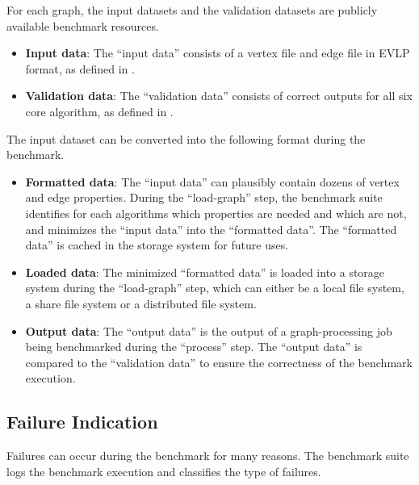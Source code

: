 For each graph, the input datasets and the validation datasets are publicly available benchmark resources.

\begin{itemize} 
    \item \textbf{Input data}: The ``input data'' consists of a vertex file and edge file in EVLP format, as defined in .
    \item \textbf{Validation data}: The ``validation data'' consists of correct outputs for all six core algorithm, as defined in .
\end{itemize}

The input dataset can be converted into the following format during the benchmark.

\begin{itemize}
    \item \textbf{Formatted data}: The ``input data'' can plausibly contain dozens of vertex and edge properties. During the ``load-graph'' step, the benchmark suite identifies for each algorithms which properties are needed and which are not, and minimizes the ``input data'' into the ``formatted data''. The ``formatted data'' is cached in the storage system for future uses. 
    \item \textbf{Loaded data}: The minimized ``formatted data'' is loaded into a storage system during the ``load-graph'' step, which can either be a local file system, a share file system or a distributed file system.
    \item \textbf{Output data}: The ``output data'' is the output of a graph-processing job being benchmarked during the ``process'' step. The ``output data'' is compared to the ``validation data'' to ensure the correctness of the benchmark execution.
\end{itemize}



\subsection{Failure Indication}
\label{sec:process:execution:failure}
Failures can occur during the benchmark for many reasons. The benchmark suite logs the benchmark execution and classifies the type of failures.


